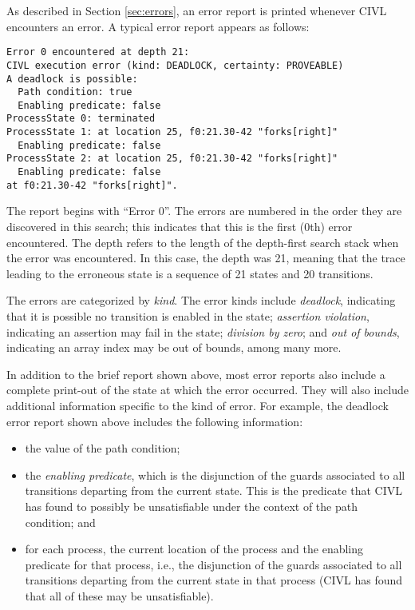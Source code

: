 As described in Section \ref{sec:errors}, an error report is printed
whenever CIVL encounters an error. A typical error report appears as
follows:
\begin{small}
\begin{verbatim}
Error 0 encountered at depth 21:
CIVL execution error (kind: DEADLOCK, certainty: PROVEABLE)
A deadlock is possible:
  Path condition: true
  Enabling predicate: false
ProcessState 0: terminated
ProcessState 1: at location 25, f0:21.30-42 "forks[right]"
  Enabling predicate: false
ProcessState 2: at location 25, f0:21.30-42 "forks[right]"
  Enabling predicate: false
at f0:21.30-42 "forks[right]".
\end{verbatim}
\end{small}

The report begins with ``Error 0''.  The errors are numbered in the
order they are discovered in this search; this indicates that this is
the first (0th) error encountered.  The depth refers to the length of
the depth-first search stack when the error was encountered.  In this
case, the depth was 21, meaning that the trace leading to the
erroneous state is a sequence of 21 states and 20 transitions.

The errors are categorized by \emph{kind}.  The error kinds include
\emph{deadlock}, indicating that it is possible no transition is
enabled in the state; \emph{assertion violation}, indicating an
assertion may fail in the state; \emph{division by zero}; and
\emph{out of bounds}, indicating an array index may be out of bounds,
among many more.

In addition to the brief report shown above, most error reports
also include a complete print-out of the state at which the error
occurred.  They will also include additional information specific
to the kind of error.  For example, the deadlock error report shown
above includes the following information:
\begin{itemize}
\item the value of the path condition;
\item the \emph{enabling predicate}, which is the disjunction of the
  guards associated to all transitions departing from the current
  state. This is the predicate that CIVL has found to possibly be
  unsatisfiable under the context of the path condition; and
\item for each process, the current location of the process and the
  enabling predicate for that process, i.e., the disjunction of the
  guards associated to all transitions departing from the current
  state in that process (CIVL has found that all of these may be
  unsatisfiable).
\end{itemize}

